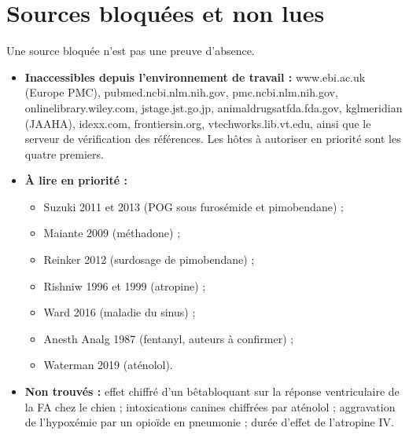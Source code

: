 \documentclass[10pt,a4paper]{article}
\begin{document}
\section{Sources bloquées et non lues}\label{sec:bloquees}
Une source bloquée n'est pas une preuve d'absence.
\begin{itemize}
\item \textbf{Inaccessibles depuis l'environnement de travail :} www.ebi.ac.uk (Europe PMC), pubmed.ncbi.nlm.nih.gov, pmc.ncbi.nlm.nih.gov, onlinelibrary.wiley.com, jstage.jst.go.jp, animaldrugsatfda.fda.gov, kglmeridian (JAAHA), idexx.com, frontiersin.org, vtechworks.lib.vt.edu, ainsi que le serveur de vérification des références. Les hôtes à autoriser en priorité sont les quatre premiers.
\item \textbf{À lire en priorité :}
\begin{itemize}
\item Suzuki 2011 et 2013 (POG sous furosémide et pimobendane) ;
\item Maiante 2009 (méthadone) ;
\item Reinker 2012 (surdosage de pimobendane) ;
\item Rishniw 1996 et 1999 (atropine) ;
\item Ward 2016 (maladie du sinus) ;
\item Anesth Analg 1987 (fentanyl, auteurs à confirmer) ;
\item Waterman 2019 (aténolol).
\end{itemize}
\item \textbf{Non trouvés :} effet chiffré d'un bêtabloquant sur la réponse ventriculaire de la FA chez le chien ; intoxications canines chiffrées par aténolol ; aggravation de l'hypoxémie par un opioïde en pneumonie ; durée d'effet de l'atropine IV.
\end{itemize}
\end{document}
